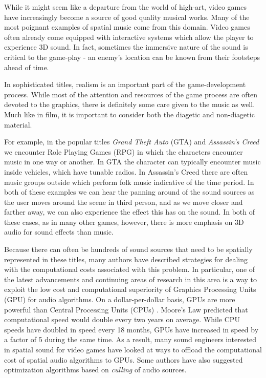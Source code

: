 While it might seem like a departure from the world of high-art, video games have increasingly become a source of good quality musical works. Many of the most poignant examples of spatial music come from this domain. Video games often already come equipped with interactive systems which allow the player to experience 3D sound. In fact, sometimes the immersive nature of the sound is critical to the game-play - an enemy's location can be known from their footsteps ahead of time. 

In sophisticated titles, realism is an important part of the game-development process. While most of the attention and resources of the game process are often devoted to the graphics, there is definitely some care given to the music as well. Much like in film, it is important to consider both the diagetic and non-diagetic material. 

For example, in the popular titles \textit{Grand Theft Auto} (GTA) and \textit{Assassin's Creed} we encounter Role Playing Games (RPG) in which the characters encounter music in one way or another. In GTA the character can typically encounter music inside vehicles, which have tunable radios. In Assassin's Creed there are often music groups outside which perform folk music indicative of the time period. In both of these examples we can hear the panning around of the sound sources as the user moves around the scene in third person, and as we move closer and farther away, we can also experience the effect this has on the sound. In both of these cases, as in many other games, however, there is more emphasis on 3D audio for sound effects than music. 

Because there can often be hundreds of sound sources that need to be spatially represented in these titles, many authors have described strategies for dealing with the computational costs associated with this problem. In particular, one of the latest advancements and continuing areas of research in this area is a way to exploit the low cost and computational superiority of Graphics Processing Units (GPU) for audio algorithms. On a dollar-per-dollar basis, GPUs are more powerful than Central Processing Units (CPUs) \cite{hamid2009review}. Moore's Law predicted that computational speed would double every two years on average. While CPU speeds have doubled in speed every 18 months, GPUs have increased in speed by a factor of 5 during the same time. As a result, many sound engineers interested in spatial sound for video games have looked at ways to offload the computational cost of spatial audio algorithms to GPUs. Some authors have also suggested optimization algorithms based on \textit{culling} of audio sources.

